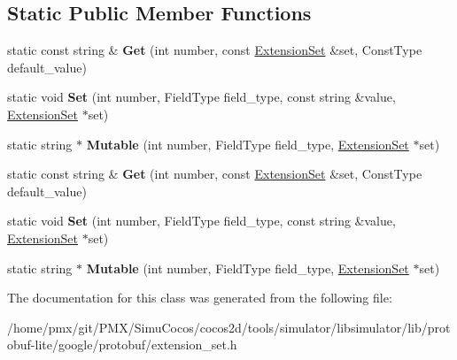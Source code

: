 \subsection*{Static Public Member Functions}
\begin{DoxyCompactItemize}
\item 
\mbox{\label{classgoogle_1_1protobuf_1_1internal_1_1StringTypeTraits_a9864e2b162920fa6482b718974686271}} 
static const string \& {\bfseries Get} (int number, const \hyperlink{classgoogle_1_1protobuf_1_1internal_1_1ExtensionSet}{Extension\+Set} \&set, Const\+Type default\+\_\+value)
\item 
\mbox{\label{classgoogle_1_1protobuf_1_1internal_1_1StringTypeTraits_aa1e41ea02d16ffddc08c240bb7e12b8d}} 
static void {\bfseries Set} (int number, Field\+Type field\+\_\+type, const string \&value, \hyperlink{classgoogle_1_1protobuf_1_1internal_1_1ExtensionSet}{Extension\+Set} $\ast$set)
\item 
\mbox{\label{classgoogle_1_1protobuf_1_1internal_1_1StringTypeTraits_a86d19c2bdfef64247ab0134bb20116eb}} 
static string $\ast$ {\bfseries Mutable} (int number, Field\+Type field\+\_\+type, \hyperlink{classgoogle_1_1protobuf_1_1internal_1_1ExtensionSet}{Extension\+Set} $\ast$set)
\item 
\mbox{\label{classgoogle_1_1protobuf_1_1internal_1_1StringTypeTraits_a9864e2b162920fa6482b718974686271}} 
static const string \& {\bfseries Get} (int number, const \hyperlink{classgoogle_1_1protobuf_1_1internal_1_1ExtensionSet}{Extension\+Set} \&set, Const\+Type default\+\_\+value)
\item 
\mbox{\label{classgoogle_1_1protobuf_1_1internal_1_1StringTypeTraits_aa1e41ea02d16ffddc08c240bb7e12b8d}} 
static void {\bfseries Set} (int number, Field\+Type field\+\_\+type, const string \&value, \hyperlink{classgoogle_1_1protobuf_1_1internal_1_1ExtensionSet}{Extension\+Set} $\ast$set)
\item 
\mbox{\label{classgoogle_1_1protobuf_1_1internal_1_1StringTypeTraits_a86d19c2bdfef64247ab0134bb20116eb}} 
static string $\ast$ {\bfseries Mutable} (int number, Field\+Type field\+\_\+type, \hyperlink{classgoogle_1_1protobuf_1_1internal_1_1ExtensionSet}{Extension\+Set} $\ast$set)
\end{DoxyCompactItemize}


The documentation for this class was generated from the following file\+:\begin{DoxyCompactItemize}
\item 
/home/pmx/git/\+P\+M\+X/\+Simu\+Cocos/cocos2d/tools/simulator/libsimulator/lib/protobuf-\/lite/google/protobuf/extension\+\_\+set.\+h\end{DoxyCompactItemize}
